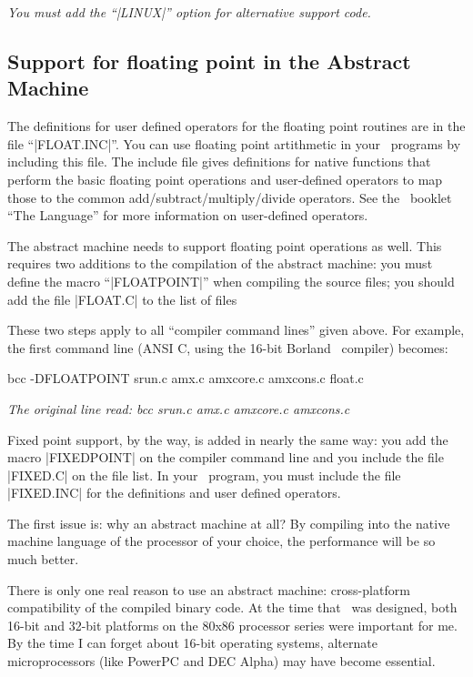         {\it You must add the ``|LINUX|'' option for alternative support code.}
\endlist


\subsection{Support for floating point in the Abstract Machine}
The definitions for user defined operators for the floating point routines are
in the file ``|FLOAT.INC|''. You can use floating point artithmetic in your
\Small\ programs by including this file. The include file gives definitions for native
functions that perform the basic floating point operations and user-defined
operators to map those to the common add\slash subtract\slash multiply\slash divide operators.
See the \Small\ booklet ``The Language'' for more information on user-defined
operators.

The abstract machine needs to support floating point operations as well. This
requires two additions to the compilation of the abstract machine:
\beginlist{1em} \compactlist
{} you must define the macro ``|FLOATPOINT|'' when compiling the source files;
 you should add the file |FLOAT.C| to the list of files
\endlist

These two steps apply to all ``compiler command lines'' given above. For example,
the first command line (ANSI C, using the 16-bit Borland \Cpp\ compiler) becomes:

\tabto 40pt {\smalltt bcc -DFLOATPOINT srun.c amx.c amxcore.c amxcons.c float.c}

\tabto 40pt {\it The original line read: {\smalltt bcc srun.c amx.c amxcore.c amxcons.c}}

Fixed point support, by the way, is added in nearly the same way: you add the
macro |FIXEDPOINT| on the compiler command line and you include the file |FIXED.C|
on the file list. In your \Small\ program, you must include the file |FIXED.INC|
for the definitions and user defined operators.


The first issue is: why an abstract machine at all? By compiling into the
native machine language of the processor of your choice, the performance will
be so much better.

There is only one real reason to use an abstract machine: cross-platform
compatibility of the compiled binary code. At the time that \Small\ was
designed, both 16-bit and 32-bit platforms on the 80x86 processor series were
important for me. By the time I can forget about 16-bit operating systems,
alternate microprocessors (like PowerPC and DEC Alpha) may have become
essential.

